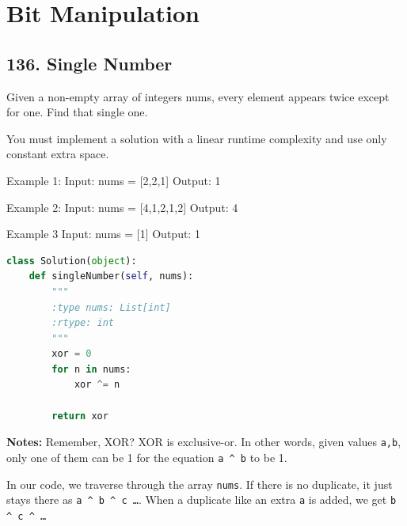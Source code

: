 \documentclass[11pt]{article}
\begin{document}
\section*{Bit Manipulation}
\subsection*{136. Single Number}
Given a non-empty array of integers nums, every element appears twice except for one. Find that single one.

You must implement a solution with a linear runtime complexity and use only constant extra space.

Example 1:
Input: nums = [2,2,1]
Output: 1

Example 2:
Input: nums = [4,1,2,1,2]
Output: 4

Example 3
Input: nums = [1]
Output: 1


\begin{lstlisting}[language=python, mathescape=true]
class Solution(object):
    def singleNumber(self, nums):
        """
        :type nums: List[int]
        :rtype: int
        """
        xor = 0
        for n in nums:
            xor ^= n

        return xor
\end{lstlisting}

\noindent \textbf{Notes:} Remember, XOR? XOR is exclusive-or. In other words, given values \texttt{a,b}, only one of them can be 1 for the equation \texttt{a \^{} b} to be 1.

\noindent In our code, we traverse through the array \texttt{nums}. If there is no duplicate, it just stays there as \texttt{a \^{} b \^{} c \dots}. When a duplicate like an extra \texttt{a} is added, we get \texttt{b \^{} c \^{} \dots}
\end{document}
